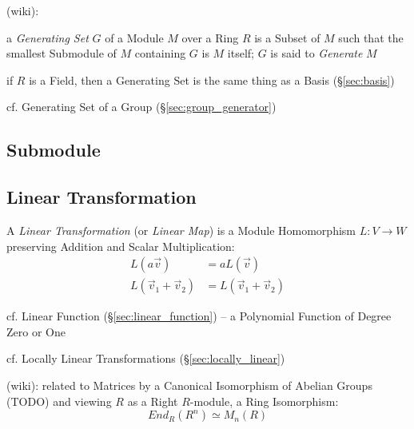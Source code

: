 (wiki):

a \emph{Generating Set} $G$ of a Module $M$ over a Ring $R$ is a Subset of $M$
such that the smallest Submodule of $M$ containing $G$ is $M$ itself; $G$ is
said to \emph{Generate} $M$

if $R$ is a Field, then a Generating Set is the same thing as a Basis
(\S\ref{sec:basis})

cf. Generating Set of a Group (\S\ref{sec:group_generator})



\subsection{Submodule}\label{sec:submodule}

\subsection{Linear Transformation}\label{sec:linear_transformation}

A \emph{Linear Transformation} (or \emph{Linear Map}) is a Module Homomorphism
$L : V \rightarrow W$ preserving Addition and Scalar Multiplication:
\begin{align*}
  L(a\vec{v})              & = aL(\vec{v}) \\
  L(\vec{v}_1 + \vec{v}_2) & = L(\vec{v}_1 + \vec{v}_2)
\end{align*}

\fist cf. Linear Function (\S\ref{sec:linear_function}) -- a Polynomial
Function of Degree Zero or One

\fist cf. Locally Linear Transformations (\S\ref{sec:locally_linear})

(wiki): related to Matrices by a Canonical Isomorphism of Abelian Groups (TODO)
and viewing $R$ as a Right $R$-module, a Ring Isomorphism:
\[
  End_R(R^n) \simeq M_n(R)
\]

